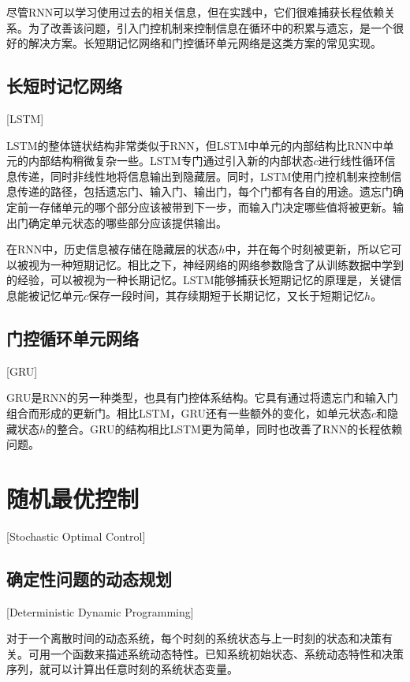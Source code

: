 尽管RNN可以学习使用过去的相关信息，但在实践中，它们很难捕获长程依赖关系。为了改善该问题，引入门控机制来控制信息在循环中的积累与遗忘，是一个很好的解决方案。长短期记忆网络\cite{hochreiterLongShortTermMemory1997}和门控循环单元网络\cite{choPropertiesNeuralMachine2014}是这类方案的常见实现。

\subsection{长短时记忆网络}[LSTM]

LSTM的整体链状结构非常类似于RNN，但LSTM中单元的内部结构比RNN中单元的内部结构稍微复杂一些。LSTM专门通过引入新的内部状态$c$进行线性循环信息传递，同时非线性地将信息输出到隐藏层。同时，LSTM使用门控机制来控制信息传递的路径，包括遗忘门、输入门、输出门，每个门都有各自的用途。遗忘门确定前一存储单元的哪个部分应该被带到下一步，而输入门决定哪些值将被更新。输出门确定单元状态的哪些部分应该提供输出。

在RNN中，历史信息被存储在隐藏层的状态$h$中，并在每个时刻被更新，所以它可以被视为一种短期记忆。相比之下，神经网络的网络参数隐含了从训练数据中学到的经验，可以被视为一种长期记忆。LSTM能够捕获长短期记忆的原理是，关键信息能被记忆单元$c$保存一段时间，其存续期短于长期记忆，又长于短期记忆$h$。

\subsection{门控循环单元网络}[GRU]

GRU是RNN的另一种类型，也具有门控体系结构。它具有通过将遗忘门和输入门组合而形成的更新门。相比LSTM，GRU还有一些额外的变化，如单元状态$c$和隐藏状态$h$的整合。GRU的结构相比LSTM更为简单，同时也改善了RNN的长程依赖问题。

\section{随机最优控制}[Stochastic Optimal Control]

\subsection{确定性问题的动态规划}[Deterministic Dynamic Programming]

对于一个离散时间的动态系统，每个时刻的系统状态与上一时刻的状态和决策有关。可用一个函数来描述系统动态特性。已知系统初始状态、系统动态特性和决策序列，就可以计算出任意时刻的系统状态变量\cite[2-4]{bertsekasReinforcementLearningOptimal2019}。

